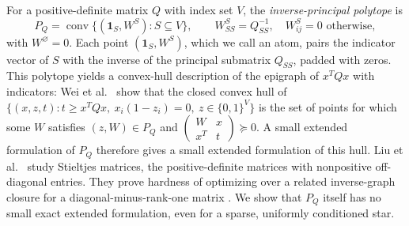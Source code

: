 For a positive-definite matrix $Q$ with index set $V$, the
\emph{inverse-principal polytope} is
\[
 P_Q=\operatorname{conv}\{(\mathbf1_S,W^S):S\subseteq V\},
 \qquad
 W^S_{SS}=Q_{SS}^{-1},\quad W^S_{ij}=0\text{ otherwise},
\]
with $W^\varnothing=0$. Each point $(\mathbf1_S,W^S)$, which we call an
atom, pairs the indicator vector of $S$ with the inverse of the
principal submatrix $Q_{SS}$, padded with zeros. This polytope yields a
convex-hull description of the epigraph of $x^TQx$ with indicators:
Wei et al.\ \cite[Section~3.1 and Theorem~1]{WeiHull} show that the
closed convex hull of
$\{(x,z,t):t\ge x^TQx,\ x_i(1-z_i)=0,\ z\in\{0,1\}^V\}$ is the set of
points for which some $W$ satisfies $(z,W)\in P_Q$ and
$\left(\begin{smallmatrix}W&x\\x^T&t\end{smallmatrix}\right)\succeq0$.
A small extended formulation of $P_Q$ therefore gives a small extended
formulation of this hull. Liu et al.\ \cite{LiuStieltjes} study
Stieltjes matrices, the positive-definite matrices with nonpositive
off-diagonal entries. They prove hardness of optimizing over a related
inverse-graph closure for a diagonal-minus-rank-one matrix
\cite[Section~4.3, Proposition~6]{LiuStieltjes}. We show that $P_Q$
itself has no small exact extended formulation, even for a sparse,
uniformly conditioned star.

